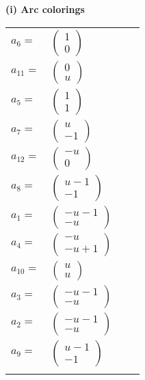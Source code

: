 \documentclass[1p]{elsarticle_modified}
\theoremstyle{definition}
\begin{document}
\flushleft \textbf{(i) Arc colorings}\\
\begin{tabular}{m{7pt} m{180pt} m{7pt} m{180pt} }
\flushright $a_{6}=$&$\begin{pmatrix}1\\0\end{pmatrix}$ \\
\flushright $a_{11}=$&$\begin{pmatrix}0\\u\end{pmatrix}$ \\
\flushright $a_{5}=$&$\begin{pmatrix}1\\1\end{pmatrix}$ \\
\flushright $a_{7}=$&$\begin{pmatrix}u\\-1\end{pmatrix}$ \\
\flushright $a_{12}=$&$\begin{pmatrix}- u\\0\end{pmatrix}$ \\
\flushright $a_{8}=$&$\begin{pmatrix}u-1\\-1\end{pmatrix}$ \\
\flushright $a_{1}=$&$\begin{pmatrix}- u-1\\- u\end{pmatrix}$ \\
\flushright $a_{4}=$&$\begin{pmatrix}- u\\- u+1\end{pmatrix}$ \\
\flushright $a_{10}=$&$\begin{pmatrix}u\\u\end{pmatrix}$ \\
\flushright $a_{3}=$&$\begin{pmatrix}- u-1\\- u\end{pmatrix}$ \\
\flushright $a_{2}=$&$\begin{pmatrix}- u-1\\- u\end{pmatrix}$ \\
\flushright $a_{9}=$&$\begin{pmatrix}u-1\\-1\end{pmatrix}$\\&\end{tabular}
\end{document}
